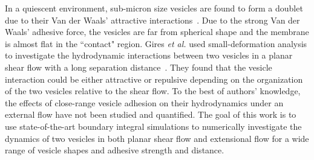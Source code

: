 \documentclass[prf,superscriptaddress,showpacs]{revtex4-1}
\begin{document}
%

In a quiescent environment, sub-micron size vesicles are found to form a
doublet due to their Van der Waals' attractive
interactions~\cite{RamachandranAndersonLealIsraelachvili2010_Langmuir}.
Due to the strong Van der Waals' adhesive force, the vesicles are far
from spherical shape and the membrane is almost flat in the ``contact"
region. Gires {\it et al.} used small-deformation analysis to
investigate the hydrodynamic interactions between two vesicles in a
planar shear flow with a long separation
distance~\cite{GiresDankerMisbah2012_PRE}. They found that the vesicle
interaction could be either attractive or repulsive depending on the
organization of the two vesicles relative to the shear flow. To the best
of authors' knowledge, the effects of close-range vesicle adhesion on
their hydrodynamics under an external flow have not been studied and
quantified. The goal of this work is to use state-of-the-art boundary
integral simulations to numerically investigate the dynamics of two
vesicles in both planar shear flow and extensional flow for a wide range
of vesicle shapes and adhesive strength and distance.
\end{document}

